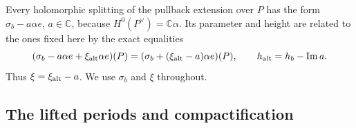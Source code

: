 \begin{remark}
\hypertarget{tag-PV04}{}\label{rem:V:splitting-change}
Every holomorphic splitting of the pullback extension over $P$
has the form $\sigma_b-a\alpha e$, $a\in\mathbb C$, because
$H^0(P^\vee)=\mathbb C\alpha$. Its parameter and height are
related to the ones fixed here by the exact equalities
\[
 (\sigma_b-a\alpha e+\xi_{\rm alt}\alpha e)(P)
  =(\sigma_b+(\xi_{\rm alt}-a)\alpha e)(P),
 \qquad h_{\rm alt}=h_b-\operatorname{Im}a.
\]
Thus $\xi=\xi_{\rm alt}-a$. We use $\sigma_b$ and $\xi$
throughout.
\end{remark}

\subsection{The lifted periods and compactification}

